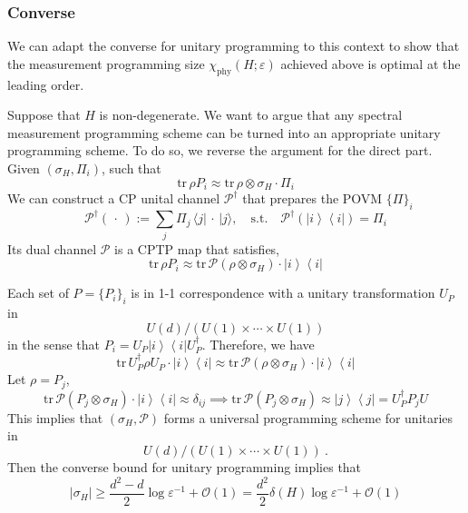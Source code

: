 \documentclass[11pt,letterpaper]{article}
\newcommand{\ket}[1]{| #1 \rangle}
\newcommand{\bra}[1]{\langle #1 |}
\newcommand{\ketbra}[2]{\left|#1\right\rangle\!\!\left\langle #2\right|}
\def\eps{\varepsilon}
\def\O{\mathcal{O}}
\def\tr{\mathrm{tr}}
\begin{document}
\subsubsection{Converse}
We can adapt the converse for unitary programming to this context to show that the measurement programming size $\chi_\mathrm{phy}(H;\eps)$ achieved above is optimal at the leading order.

Suppose that $H$ is non-degenerate. We want to argue that any spectral measurement programming scheme can be turned into an appropriate unitary programming scheme. To do so, we reverse the argument for the direct part. Given $(\sigma_H,\Pi_i)$, such that
\begin{equation}
    \tr\,\rho P_i\approx\tr\,\rho\otimes\sigma_H\cdot\Pi_i
\end{equation}
We can construct a CP unital channel $\mathcal{P}^\dagger$ that prepares the POVM $\{\Pi\}_i$
\begin{equation}
    \mathcal{P}^\dagger(\,\cdot\,):=\sum_j \Pi_j\, \bra{j}\,\cdot\,\ket{j},\quad\mathrm{s.t.}\quad \mathcal{P}^\dagger(\ketbra{i}{i})=\Pi_i
\end{equation}
Its dual channel $\mathcal{P}$ is a CPTP map that satisfies,
\begin{equation}
    \tr\,\rho P_i\approx\tr\,\mathcal{P}(\rho\otimes\sigma_H)\cdot\ketbra{i}{i}
\end{equation}

Each set of $P=\{P_i\}_i$ is in 1-1 correspondence with a unitary transformation $U_P$ in
\begin{equation}
        U(d)\Big/(U(1)\times\cdots\times U(1))
\end{equation}
in the sense that
$P_i=U_P\ketbra{i}{i}U_P^\dagger$. Therefore, we have
\begin{equation}
    \tr\,U_P^\dagger\rho U_P\cdot\ketbra{i}{i}\approx\tr\,\mathcal{P}(\rho\otimes\sigma_H)\cdot\ketbra{i}{i}
\end{equation}
Let $\rho=P_j$,
\begin{equation}
    \tr\,\mathcal{P}(P_j\otimes\sigma_H)\cdot\ketbra{i}{i}\approx \delta_{ij}\implies \tr\,\mathcal{P}(P_j\otimes\sigma_H)\approx \ketbra{j}{j} = U^\dagger_P P_j U
\end{equation}
This implies that $(\sigma_H,\mathcal{P})$ forms a universal programming scheme for unitaries in
\begin{equation}
        U(d)\Big/(U(1)\times\cdots\times U(1))\ .
\end{equation}
Then the converse bound for unitary programming implies that 
\begin{equation}
    |\sigma_H|\ge \frac{d^2-d}{2}\log\eps^{-1} +\O(1) = \frac{d^2}{2}\delta(H)\log\eps^{-1}+\O(1)
\end{equation}
\end{document}
